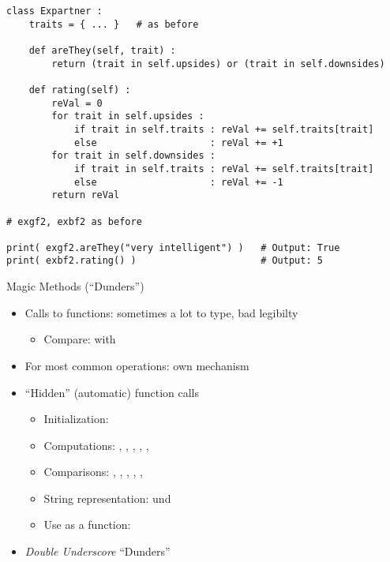 \begin{frame}[fragile]
%
\begin{codebox}
\begin{verbatim}
class Expartner :
    traits = { ... }   # as before
   
    def areThey(self, trait) :
        return (trait in self.upsides) or (trait in self.downsides)
    
    def rating(self) :
        reVal = 0
        for trait in self.upsides :
            if trait in self.traits : reVal += self.traits[trait]
            else                    : reVal += +1
        for trait in self.downsides :
            if trait in self.traits : reVal += self.traits[trait]
            else                    : reVal += -1
        return reVal

# exgf2, exbf2 as before

print( exgf2.areThey("very intelligent") )   # Output: True
print( exbf2.rating() )                      # Output: 5
\end{verbatim}
\end{codebox}
%
\end{frame}



\begin{frame}{Magic Methods (\enquote{Dunders})}
%
\begin{itemize}
\item Calls to functions: sometimes a lot to type, bad legibilty
	\begin{itemize}
	\item Compare:  with 
	\end{itemize}
\item[\Thus] For most common operations: own mechanism
\item \enquote{Hidden} (automatic) function calls
	\begin{itemize}
	\item Initialization: 
	\item Computations: , , , , , 
	\item Comparisons: , , , , , 
	\item String representation:  und 
	\item Use as a function: 
	\end{itemize}
\item \emph{Double Underscore} \Thus \enquote{Dunders}
\end{itemize}
%
\end{frame}


